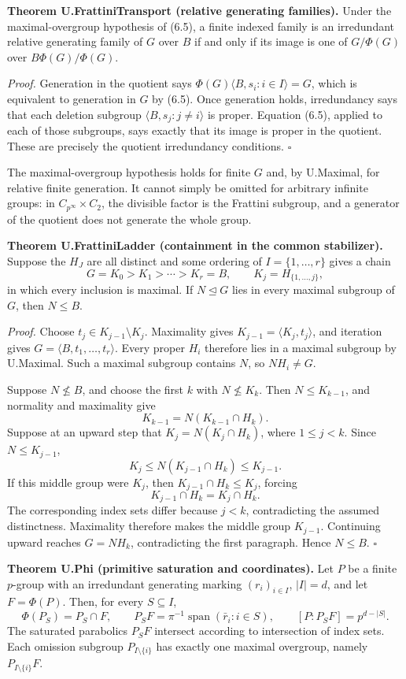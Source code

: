 \documentclass[
  11pt,
  a4paper,
]{article}
\begin{document}
\textbf{Theorem U.FrattiniTransport (relative generating families).}
Under the maximal-overgroup hypothesis of (6.5), a finite indexed family
is an irredundant relative generating family of \(G\) over \(B\) if and
only if its image is one of \(G/\Phi(G)\) over \(B\Phi(G)/\Phi(G)\).

\emph{Proof.} Generation in the quotient says
\(\Phi(G)\langle B,s_i:i\in I\rangle=G\), which is equivalent to
generation in \(G\) by (6.5). Once generation holds, irredundancy says
that each deletion subgroup \(\langle B,s_j:j\ne i\rangle\) is proper.
Equation (6.5), applied to each of those subgroups, says exactly that
its image is proper in the quotient. These are precisely the quotient
irredundancy conditions. \(\square\)

The maximal-overgroup hypothesis holds for finite \(G\) and, by
U.Maximal, for relative finite generation. It cannot simply be omitted
for arbitrary infinite groups: in \(C_{p^\infty}\times C_2\), the
divisible factor is the Frattini subgroup, and a generator of the
quotient does not generate the whole group.

\textbf{Theorem U.FrattiniLadder (containment in the common
stabilizer).} Suppose the \(H_J\) are all distinct and some ordering of
\(I=\{1,\ldots,r\}\) gives a chain \[
G=K_0>K_1>\cdots>K_r=B,\qquad K_j=H_{\{1,\ldots,j\}},
\tag{6.6}
\] in which every inclusion is maximal. If \(N\unlhd G\) lies in every
maximal subgroup of \(G\), then \(N\leq B\).

\emph{Proof.} Choose \(t_j\in K_{j-1}\setminus K_j\). Maximality gives
\(K_{j-1}=\langle K_j,t_j\rangle\), and iteration gives
\(G=\langle B,t_1,\ldots,t_r\rangle\). Every proper \(H_i\) therefore
lies in a maximal subgroup by U.Maximal. Such a maximal subgroup
contains \(N\), so \(NH_i\ne G\).

Suppose \(N\not\leq B\), and choose the first \(k\) with
\(N\not\leq K_k\). Then \(N\leq K_{k-1}\), and normality and maximality
give \[
K_{k-1}=N(K_{k-1}\cap H_k).
\] Suppose at an upward step that \(K_j=N(K_j\cap H_k)\), where
\(1\leq j<k\). Since \(N\leq K_{j-1}\), \[
K_j\leq N(K_{j-1}\cap H_k)\leq K_{j-1}.
\] If this middle group were \(K_j\), then \(K_{j-1}\cap H_k\leq K_j\),
forcing \[
K_{j-1}\cap H_k=K_j\cap H_k.
\] The corresponding index sets differ because \(j<k\), contradicting
the assumed distinctness. Maximality therefore makes the middle group
\(K_{j-1}\). Continuing upward reaches \(G=NH_k\), contradicting the
first paragraph. Hence \(N\leq B\). \(\square\)

\textbf{Theorem U.Phi (primitive saturation and coordinates).} Let \(P\)
be a finite \(p\)-group with an irredundant generating marking
\((r_i)_{i\in I}\), \(|I|=d\), and let \(F=\Phi(P)\). Then, for every
\(S\subseteq I\), \[
\Phi(P_S)=P_S\cap F,\qquad
P_SF=\pi^{-1}\operatorname{span}(\bar r_i:i\in S),\qquad
[P:P_SF]=p^{d-|S|}.
\tag{6.7}
\] The saturated parabolics \(P_SF\) intersect according to intersection
of index sets. Each omission subgroup \(P_{I\setminus\{i\}}\) has
exactly one maximal overgroup, namely \(P_{I\setminus\{i\}}F\).
\end{document}
